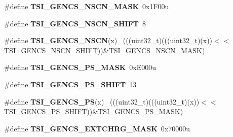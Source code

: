 \begin{DoxyCompactItemize}
\item 
\hypertarget{group___t_s_i___register___masks_ga3a420e0ae200374eca1a185b535cc0ba}{}\#define {\bfseries T\+S\+I\+\_\+\+G\+E\+N\+C\+S\+\_\+\+N\+S\+C\+N\+\_\+\+M\+A\+S\+K}~0x1\+F00u\label{group___t_s_i___register___masks_ga3a420e0ae200374eca1a185b535cc0ba}

\item 
\hypertarget{group___t_s_i___register___masks_gab90732bc69449d59a0fc0f3c208caf21}{}\#define {\bfseries T\+S\+I\+\_\+\+G\+E\+N\+C\+S\+\_\+\+N\+S\+C\+N\+\_\+\+S\+H\+I\+F\+T}~8\label{group___t_s_i___register___masks_gab90732bc69449d59a0fc0f3c208caf21}

\item 
\hypertarget{group___t_s_i___register___masks_ga88b69a519adf7824cdb68192fb98b684}{}\#define {\bfseries T\+S\+I\+\_\+\+G\+E\+N\+C\+S\+\_\+\+N\+S\+C\+N}(x)                                            ~(((uint32\+\_\+t)(((uint32\+\_\+t)(x))$<$$<$T\+S\+I\+\_\+\+G\+E\+N\+C\+S\+\_\+\+N\+S\+C\+N\+\_\+\+S\+H\+I\+F\+T))\&T\+S\+I\+\_\+\+G\+E\+N\+C\+S\+\_\+\+N\+S\+C\+N\+\_\+\+M\+A\+S\+K)\label{group___t_s_i___register___masks_ga88b69a519adf7824cdb68192fb98b684}

\item 
\hypertarget{group___t_s_i___register___masks_ga3c608c250c31872d206e9c18eea97799}{}\#define {\bfseries T\+S\+I\+\_\+\+G\+E\+N\+C\+S\+\_\+\+P\+S\+\_\+\+M\+A\+S\+K}~0x\+E000u\label{group___t_s_i___register___masks_ga3c608c250c31872d206e9c18eea97799}

\item 
\hypertarget{group___t_s_i___register___masks_gaae1f3b081a9c92fefe10bd3ec1f40734}{}\#define {\bfseries T\+S\+I\+\_\+\+G\+E\+N\+C\+S\+\_\+\+P\+S\+\_\+\+S\+H\+I\+F\+T}~13\label{group___t_s_i___register___masks_gaae1f3b081a9c92fefe10bd3ec1f40734}

\item 
\hypertarget{group___t_s_i___register___masks_ga6edb5dbc41896c6d33fd1395d9e1a17d}{}\#define {\bfseries T\+S\+I\+\_\+\+G\+E\+N\+C\+S\+\_\+\+P\+S}(x)                                                ~(((uint32\+\_\+t)(((uint32\+\_\+t)(x))$<$$<$T\+S\+I\+\_\+\+G\+E\+N\+C\+S\+\_\+\+P\+S\+\_\+\+S\+H\+I\+F\+T))\&T\+S\+I\+\_\+\+G\+E\+N\+C\+S\+\_\+\+P\+S\+\_\+\+M\+A\+S\+K)\label{group___t_s_i___register___masks_ga6edb5dbc41896c6d33fd1395d9e1a17d}

\item 
\hypertarget{group___t_s_i___register___masks_ga14b70379252ea633e8c97c1ab13553c6}{}\#define {\bfseries T\+S\+I\+\_\+\+G\+E\+N\+C\+S\+\_\+\+E\+X\+T\+C\+H\+R\+G\+\_\+\+M\+A\+S\+K}~0x70000u\label{group___t_s_i___register___masks_ga14b70379252ea633e8c97c1ab13553c6}


\end{DoxyCompactItemize}
